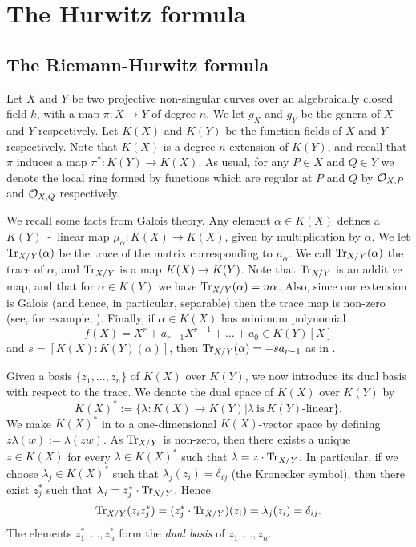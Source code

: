 \chapter{The Hurwitz formula} \label{Chapter:hurwitzformula}
\section{The Riemann-Hurwitz formula}\label{Hurwitzsection}

Let $X$ and $Y$ be two projective non-singular curves over an algebraically closed field $k$, with a map $\pi \colon X \rightarrow Y$ of degree $n$.
We let $g_X$ and $g_Y$ be the genera of $X$ and $Y$ respectively.
Let $K(X)$ and $K(Y)$ be the function fields of $X$ and $Y$ respectively.
Note that $K(X)$ is a degree $n$ extension of $K(Y)$, and recall that $\pi$ induces a map $\pi^*\colon K(Y) \rightarrow K(X)$.
As usual, for any $P \in X$ and $Q \in Y$ we denote the local ring formed by functions which are regular at $P$ and $Q$ by ${\cal O}_{X,P}$ and ${\cal O}_{X,Q}$ respectively.

We recall some facts from Galois theory.
Any element $\alpha \in K(X)$ defines a $K(Y)$~-~linear map $\mu_{\alpha} \colon  K(X) \rightarrow K(X)$, given by multiplication by $\alpha$.
We let $\operatorname{Tr}_{X/Y}(\alpha)$ be the trace of the matrix corresponding to $\mu_\alpha$.
We call $\operatorname{Tr}_{X/Y}(\alpha)$ the trace of $\alpha$, and $\operatorname{Tr}_{X/Y}$ is a map $K(X) \rightarrow K(Y)$.
Note that $\operatorname{Tr}_{X/Y}$ is an additive map, and that for $\alpha \in K(Y)$ we have $\operatorname{Tr}_{X/Y}(\alpha) = n \alpha$.
Also, since our extension is Galois (and hence, in particular, separable) then the trace map is non-zero (see, for example, \cite[Appendix A]{stichtenoth}).
Finally, if $\alpha \in K(X)$ has minimum polynomial 
\[
 f(X) = X^r + a_{r-1}X^{r-1} + \ldots +a_0 \in K(Y)[X]
\]
 and $s= [K(X):K(Y)(\alpha)]$, then $\operatorname{Tr}_{X/Y}(\alpha) = -sa_{r-1}$ as in \cite[Appendix A]{stichtenoth}.

Given a basis $\{z_1,\ldots,z_n\}$ of $K(X)$ over $K(Y)$, we now introduce its dual basis with respect to the trace.
We denote the dual space of $K(X)$ over $K(Y)$ by \[K(X)^*:=\{\lambda \colon K(X) \rightarrow K(Y)| \lambda\ \text{is}\ K(Y)\text{-linear}\}.\]
We make $K(X)^*$ in to a one-dimensional $K(X)$-vector space by defining $z \lambda(w):=\lambda(z w)$.
As $\operatorname{Tr}_{X/Y}$ is non-zero, then there exists a unique $z\in K(X)$ for every $\lambda \in K(X)^*$ such that $\lambda = z\cdot \operatorname{Tr}_{X/Y}$.
In particular, if we choose $\lambda_j\in K(X)^*$ such that $\lambda_j(z_i) = \delta_{ij}$ (the Kronecker symbol), then there exist $z_j^*$ such that $\lambda_j = z_j^*\cdot \operatorname{Tr}_{X/Y}$.
Hence
\[
 \operatorname{Tr}_{X/Y}(z_iz_j^*) = (z_j^*\cdot \operatorname{Tr}_{X/Y})(z_i) = \lambda_j(z_i) = \delta_{ij}.
\]
The elements $z_1^*, \ldots , z_n^*$ form the {\em dual basis} of $z_1, \ldots , z_n$.

